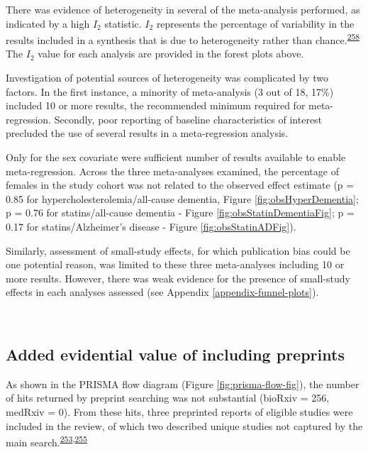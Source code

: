 \documentclass[a4paper, twoside]{templates/ociamthesis}
\begin{document}
There was evidence of heterogeneity in several of the meta-analysis performed, as indicated by a high \(I_2\) statistic. \(I_2\) represents the percentage of variability in the results included in a synthesis that is due to heterogeneity rather than chance.\textsuperscript{\protect\hyperlink{ref-higgins2003}{258}} The \(I_2\) value for each analysis are provided in the forest plots above.

Investigation of potential sources of heterogeneity was complicated by two factors. In the first instance, a minority of meta-analysis (3 out of 18, 17\%) included 10 or more results, the recommended minimum required for meta-regression. Secondly, poor reporting of baseline characteristics of interest precluded the use of several results in a meta-regression analysis.

Only for the sex covariate were sufficient number of results available to enable meta-regression. Across the three meta-analyses examined, the percentage of females in the study cohort was not related to the observed effect estimate (p = 0.85 for hypercholesterolemia/all-cause dementia, Figure \ref{fig:obsHyperDementia}; p = 0.76 for statins/all-cause dementia - Figure \ref{fig:obsStatinDementiaFig}; p = 0.17 for statins/Alzheimer's disease - Figure \ref{fig:obsStatinADFig}).

Similarly, assessment of small-study effects, for which publication bias could be one potential reason, was limited to these three meta-analyses including 10 or more results. However, there was weak evidence for the presence of small-study effects in each analyses assessed (see Appendix \ref{appendix-funnel-plots}).

~

\hypertarget{sys-rev-including-preprints-res}{%
\subsection{Added evidential value of including preprints}\label{sys-rev-including-preprints-res}}

As shown in the PRISMA flow diagram (Figure \ref{fig:prisma-flow-fig}), the number of hits returned by preprint searching was not substantial (bioRxiv = 256, medRxiv = 0). From these hits, three preprinted reports of eligible studies were included in the review, of which two described unique studies not captured by the main search.\textsuperscript{\protect\hyperlink{ref-so2017}{253},\protect\hyperlink{ref-andrews2019}{255}}
\end{document}
